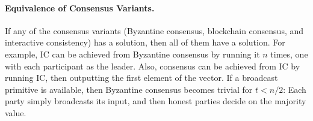 \documentclass[11pt]{article}
\theoremstyle{mytheoremstyle}
\begin{document}

\paragraph{Equivalence of Consensus Variants.} If any of the consensus variants (Byzantine consensus, blockchain consensus, and interactive consistency) has a solution, then all of them have a solution. For example, IC can be achieved from Byzantine consensus by running it $n$ times, one with each participant as the leader. Also, consensus can be achieved from IC by running IC, then outputting the first element of the vector. 
If a broadcast primitive is available, then Byzantine consensus becomes trivial for ${t<n/2}$: Each party simply broadcasts its input, and then honest parties decide on the majority value.
\end{document}

